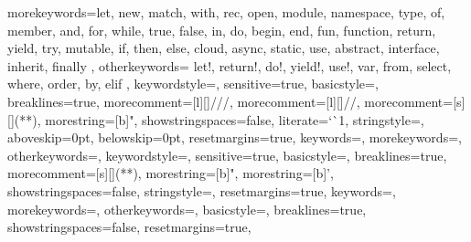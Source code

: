 %
{morekeywords={let, new, match, with, rec, open, module, namespace, type, of, member, %
and, for, while, true, false, in, do, begin, end, fun, function, return, yield, try, %
mutable, if, then, else, cloud, async, static, use, abstract, interface, inherit, finally },
  otherkeywords={ let!, return!, do!, yield!, use!, var, from, select,
    where, order, by, elif },
  keywordstyle=\color{keywordsColor},
  sensitive=true,
  basicstyle=\ttfamily,
	breaklines=true,
  morecomment=[l][\color{commentsColor}]{///},
  morecomment=[l][\color{commentsColor}]{//},
  morecomment=[s][\color{commentsColor}]{{(*}{*)}},
  morestring=[b]",
  showstringspaces=false,
  literate={`}{\`}1,
  stringstyle=\color{stringsColor},
  aboveskip=0pt, 
  belowskip=0pt,
  resetmargins=true,
}
%
{keywords={},
  morekeywords={},
  otherkeywords={},
  keywordstyle=\color{keywordsColor},
  sensitive=true,
  basicstyle=\ttfamily, breaklines=true,
  morecomment=[s][\color{commentsColor}]{{(*}{*)}},
  morestring=[b]",
  morestring=[b]',
  showstringspaces=false,
  stringstyle=\color{stringsColor},
  resetmargins=true,
}
%
{keywords={},
  morekeywords={},
  otherkeywords={},
  basicstyle=\ttfamily, breaklines=true,
  showstringspaces=false,
  resetmargins=true,
}
\lstset{language=console}

\usepackage{verbdef}
\verbdef{\cmdl}{>}


\newcommand{\fs}[2]{
  \begin{mdframed}[frametitle=#1.fsx,frametitlerulewidth=0.4pt,frametitlerule=true]
      
      \noindent\makebox[\linewidth]{\rule{\linewidth}{0.4pt}}
      \cmdl\texttt{ fsharpi #1.fsx}
      
  \end{mdframed}
}
\newcommand{\fse}[2]{
  \begin{mdframed}[frametitle=#1.fsx,frametitlerulewidth=0.4pt,frametitlerule=true]
    \begin{minipage}{1\linewidth}
      
    \end{minipage}
  \end{mdframed}
}


